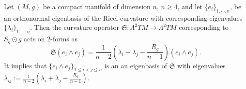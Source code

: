 \documentclass[10pt,a4paper]{amsart}
\def \La {\Lambda}
\def \la {\lambda}
\begin{document}
	\begin{lemma}\label{P5}
		Let $(M,g)$ be a compact manifold of dimension $n$, $n\geq4$, and let $\{e_{i}\}_{1,\cdots,n}$, be an orthonormal eigenbasis of the Ricci curvature with corresponding eigenvalues $\{\la_{i} \}_{1,\cdots,n}$. Then the curvature operator $\mathfrak{S}:\La^{2}TM\rightarrow\La^{2}TM$ corresponding to $S_{g}\odot g$ acts on $2$-forms as
		\begin{equation*}
		\mathfrak{S}(e_{i}\wedge e_{j})=\frac{1}{n-2}\left(\la_{i}+\la_{j}-\frac{R_{g}}{n-1}\right)(e_{i}\wedge e_{j}).
		\end{equation*}
		It implies that $\{e_{i}\wedge e_{j}\}_{1\leq i<j\leq n}$ is an  an eigenbasis of $\mathfrak{S}$ with eigenvalues
		$\la_{ij}:=\frac{1}{n-2}(\la_{i}+\la_{j}-\frac{R_{g}}{n-1})$.
	\end{lemma}
\end{document}
